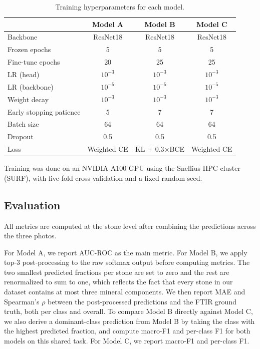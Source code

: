 \documentclass[10pt,twocolumn]{article}
\begin{document}
\begin{table}[t]
    \centering
    \caption{Training hyperparameters for each model.}
    \label{tab:hyperparams}
    \begin{tabular}{lccc}
        \toprule
        & Model A & Model B & Model C \\
        \midrule
        Backbone & ResNet18 & ResNet18 & ResNet18 \\
        Frozen epochs & 5 & 5 & 5 \\
        Fine-tune epochs & 20 & 25 & 25 \\
        LR (head) & $10^{-3}$ & $10^{-3}$ & $10^{-3}$ \\
        LR (backbone) & $10^{-5}$ & $10^{-5}$ & $10^{-5}$ \\
        Weight decay & $10^{-3}$ & $10^{-3}$ & $10^{-3}$ \\
        Early stopping patience & 5 & 7 & 7 \\
        Batch size & 64 & 64 & 64 \\
        Dropout & 0.5 & 0.5 & 0.5 \\
        Loss & Weighted CE & KL + 0.3$\times$BCE & Weighted CE \\
        \bottomrule
    \end{tabular}
\end{table}

Training was done on an NVIDIA A100 GPU using the Snellius HPC cluster (SURF), with five-fold cross validation and a fixed random seed.

\subsection*{Evaluation}

All metrics are computed at the stone level after combining the predictions across the three photos.

For Model A, we report AUC-ROC as the main metric. For Model B, we apply top-3 post-processing to the raw softmax output before computing metrics. The two smallest predicted fractions per stone are set to zero and the rest are renormalized to sum to one, which reflects the fact that every stone in our dataset contains at most three mineral components. We then report MAE and Spearman's $\rho$ between the post-processed predictions and the FTIR ground truth, both per class and overall. To compare Model B directly against Model C, we also derive a dominant-class prediction from Model B by taking the class with the highest predicted fraction, and compute macro-F1 and per-class F1 for both models on this shared task. For Model C, we report macro-F1 and per-class F1.
\end{document}
